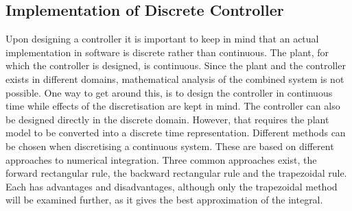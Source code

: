 \documentclass[../../main.tex]{subfiles}
\begin{document}
\subsection*{Implementation of Discrete Controller}
Upon designing a controller it is important to keep in mind that an actual implementation in software is discrete rather than continuous. 
The plant, for which the controller is designed, is continuous. Since the plant and the controller exists in different domains, mathematical analysis of the combined system is not possible. One way to get around this, is to design the controller in continuous time while effects of the discretisation are kept in mind. The controller can also be designed directly in the discrete domain. However, that requires the plant model to be converted into a discrete time representation. 
Different methods can be chosen when discretising a continuous system. These are based on different approaches to numerical integration. Three common approaches exist, the forward rectangular rule, the backward rectangular rule and the trapezoidal rule. Each has advantages and disadvantages, although only the trapezoidal method will be examined further, as it gives the best approximation of the integral.


\end{document}
